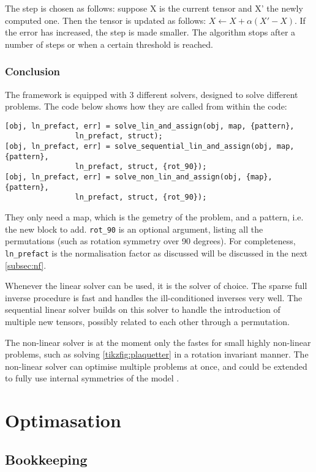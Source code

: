 The step is chosen as follows: suppose X is the current tensor and X' the newly computed one. Then the tensor is updated as follows: $X \leftarrow X + \alpha (X'-X)$. If the error has increased, the step is made smaller. The algorithm stops after a number of steps or when a certain threshold is reached.

\subsubsection{Conclusion}

The framework is equipped with 3 different solvers, designed to solve different problems. The code below shows how they are called from within the code:
\begin{verbatim}
[obj, ln_prefact, err] = solve_lin_and_assign(obj, map, {pattern}, 
                ln_prefact, struct);
[obj, ln_prefact, err] = solve_sequential_lin_and_assign(obj, map, {pattern},
                ln_prefact, struct, {rot_90});
[obj, ln_prefact, err] = solve_non_lin_and_assign(obj, {map}, {pattern}, 
                ln_prefact, struct, {rot_90});
\end{verbatim}
They only need a map, which is the gemetry of the problem, and a pattern, i.e. the new block to add. \verb#rot_90# is an optional argument, listing all the permutations (such as rotation symmetry over 90 degrees). For completeness, \verb#ln_prefact# is the normalisation factor as discussed will be discussed in the next \cref{subsec:nf}.

Whenever the linear solver can be used, it is the solver of choice. The sparse full inverse procedure is fast and handles the ill-conditioned inverses very well. The sequential linear solver builds on this solver to handle the introduction of multiple new tensors, possibly related to each other through a permutation.

The non-linear solver is at the moment only the fastes for small highly non-linear problems, such as solving \cref{tikzfig:plaquetter} in a rotation invariant manner. The non-linear solver can optimise multiple problems at once, and could be extended to fully use internal symmetries of the model .

\section{Optimasation}

\subsection{Bookkeeping}

